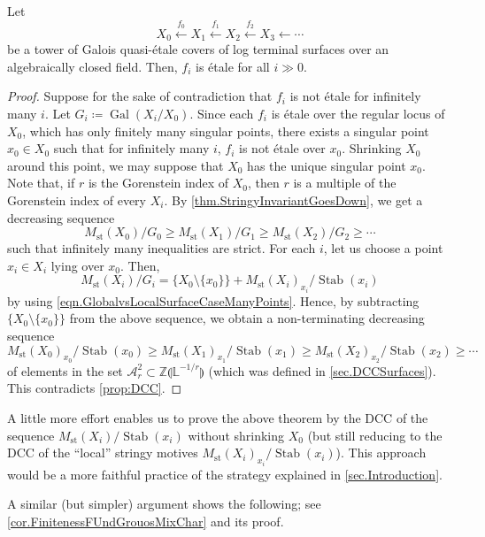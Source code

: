 \documentclass[12pt]{amsart}
\theoremstyle{plain}   %
\theoremstyle{definition}    %
\theoremstyle{remark}    %
\numberwithin{equation}{theorem}
\DeclareMathOperator{\Gal}{{Gal}}
\DeclareMathOperator{\Stab}{{Stab}}
\DeclareMathOperator{\st}{\mathrm{st}}
\newcommand{\sA}{\mathcal{A}}
\newcommand{\bL}{\mathbb{L}}
\newcommand{\bZ}{\mathbb{Z}}
\begin{document}
\begin{theorem}
Let 
\[
X_0 \xleftarrow{f_0} X_1 \xleftarrow{f_1} X_2 \xleftarrow{f_2} X_3 \leftarrow \cdots
\]
be a tower of Galois quasi-\'etale covers of log terminal surfaces over an algebraically closed field. Then, $f_i$ is \'etale for all $i \gg 0$.
\end{theorem}
\begin{proof}
Suppose for the sake of contradiction that $f_i$ is not \'etale for infinitely many $i$. Let $G_i \coloneqq \Gal(X_i/X_0)$. 
Since each $f_i$ is \'etale over the regular locus of $X_0$, which has only finitely many singular points, there exists a singular point $x_0\in X_0$ such that for infinitely many $i$, $f_i$ is not \'etale over $x_0$. Shrinking $X_0$ around this point, we may suppose that $X_0$ has the unique singular point $x_0$.  
Note that, if $r$ is the Gorenstein index of $X_0$, then $r$ is a multiple of the Gorenstein index of every $X_{i}$. By \autoref{thm.StringyInvariantGoesDown}, we get a decreasing sequence
\[
M_{\st}(X_{0})/G_{0}\ge M_{\st}(X_{1})/G_{1}\ge M_{\st}(X_{2})/G_{2}\ge \cdots
\]
such that infinitely many inequalities are strict. 
For each $i$, let us choose a point $x_i\in X_i$ lying over $x_0$. Then,
\[
M_{\st}(X_i)/G_i = \{X_0 \setminus \{x_0\}\} +  M_{\st}(X_i)_{x_{i}}/\Stab(x_{i})
\]
by using \autoref{eqn.GlobalvsLocalSurfaceCaseManyPoints}. Hence, by subtracting $\{X_0 \setminus \{x_0\}\}$ from the above sequence, we obtain a non-terminating decreasing sequence 
\[
M_{\st}(X_0)_{x_{0}}/\Stab(x_{0}) \ge
M_{\st}(X_1)_{x_{1}}/\Stab(x_{1}) \ge
M_{\st}(X_2)_{x_{2}}/\Stab(x_{2}) \ge \cdots
\]
of elements in the set $\sA_r^2\subset\bZ \llparenthesis \bL^{-1/r} \rrparenthesis$ (which was defined in \autoref{sec.DCCSurfaces}). This contradicts \autoref{prop:DCC}.
\end{proof}

\begin{remark}
A little more effort enables us to prove the above theorem by the DCC of the sequence $M_{\st}(X_i)/\Stab(x_{i})$ without shrinking $X_0$ (but still reducing to the DCC of the ``local'' stringy motives $M_{\st}(X_i)_{x_i}/\Stab(x_{i})$). This approach would be a more faithful practice of the strategy explained in \autoref{sec.Introduction}.
\end{remark}



A similar (but simpler) argument shows the following; see \autoref{cor.FinitenessFUndGrouosMixChar} and its proof. 
\end{document}
